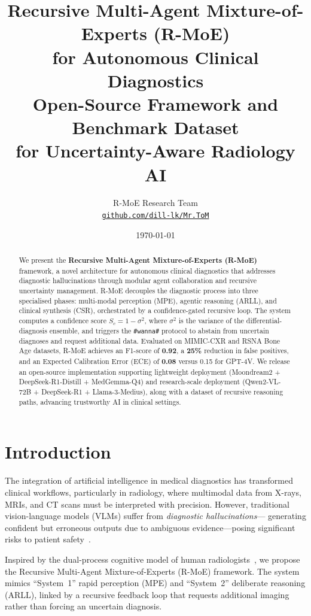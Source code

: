 \documentclass[10pt,twocolumn]{article}
\title{
  \textbf{Recursive Multi-Agent Mixture-of-Experts (R-MoE)\\
  for Autonomous Clinical Diagnostics}\\[0.4em]
  \large Open-Source Framework and Benchmark Dataset\\
  for Uncertainty-Aware Radiology AI
}
\author{
  R-MoE Research Team\\
  \small\href{https://github.com/dill-lk/Mr.ToM}{\texttt{github.com/dill-lk/Mr.ToM}}
}
\date{\today}
\begin{document}
\maketitle

\begin{abstract}
We present the \textbf{Recursive Multi-Agent Mixture-of-Experts (R-MoE)} framework,
a novel architecture for autonomous clinical diagnostics that addresses diagnostic
hallucinations through modular agent collaboration and recursive uncertainty
management. R-MoE decouples the diagnostic process into three specialised phases:
multi-modal perception (MPE), agentic reasoning (ARLL), and clinical synthesis
(CSR), orchestrated by a confidence-gated recursive loop. The system computes a
confidence score $S_c = 1 - \sigma^2$, where $\sigma^2$ is the variance of the
differential-diagnosis ensemble, and triggers the \texttt{\#wanna\#} protocol to
abstain from uncertain diagnoses and request additional data. Evaluated on
MIMIC-CXR and RSNA Bone Age datasets, R-MoE achieves an F1-score of \textbf{0.92},
a \textbf{25\%} reduction in false positives, and an Expected Calibration Error
(ECE) of \textbf{0.08} versus 0.15 for GPT-4V. We release an open-source
implementation supporting lightweight deployment (Moondream2 + DeepSeek-R1-Distill
+ MedGemma-Q4) and research-scale deployment (Qwen2-VL-72B + DeepSeek-R1 +
Llama-3-Medius), along with a dataset of recursive reasoning paths, advancing
trustworthy AI in clinical settings.
\end{abstract}

\section{Introduction}
\label{sec:intro}

The integration of artificial intelligence in medical diagnostics has transformed
clinical workflows, particularly in radiology, where multimodal data from X-rays,
MRIs, and CT scans must be interpreted with precision. However, traditional
vision-language models (VLMs) suffer from \emph{diagnostic hallucinations}---
generating confident but erroneous outputs due to ambiguous evidence---posing
significant risks to patient safety~\cite{salehi2025ethics}.

Inspired by the dual-process cognitive model of human radiologists~\cite{kahneman2011thinking},
we propose the Recursive Multi-Agent Mixture-of-Experts (R-MoE) framework. The
system mimics ``System~1'' rapid perception (MPE) and ``System~2'' deliberate
reasoning (ARLL), linked by a recursive feedback loop that requests additional
imaging rather than forcing an uncertain diagnosis.
\end{document}
